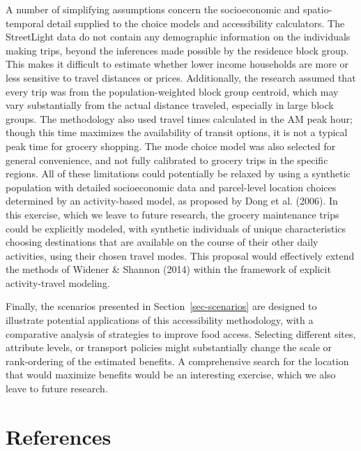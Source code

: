 \documentclass[
  letterpaper,
  number,
  review,
  3p]{elsarticle}
\begin{document}
A number of simplifying assumptions concern the socioeconomic and
spatio-temporal detail supplied to the choice models and accessibility
calculators. The StreetLight data do not contain any demographic
information on the individuals making trips, beyond the inferences made
possible by the residence block group. This makes it difficult to
estimate whether lower income households are more or less sensitive to
travel distances or prices. Additionally, the research assumed that
every trip was from the population-weighted block group centroid, which
may vary substantially from the actual distance traveled, especially in
large block groups. The methodology also used travel times calculated in
the AM peak hour; though this time maximizes the availability of transit
options, it is not a typical peak time for grocery shopping. The mode
choice model was also selected for general convenience, and not fully
calibrated to grocery trips in the specific regions. All of these
limitations could potentially be relaxed by using a synthetic population
with detailed socioeconomic data and parcel-level location choices
determined by an activity-based model, as proposed by Dong et al.
(2006). In this exercise, which we leave to future research, the grocery
maintenance trips could be explicitly modeled, with synthetic
individuals of unique characteristics choosing destinations that are
available on the course of their other daily activities, using their
chosen travel modes. This proposal would effectively extend the methods
of Widener \& Shannon (2014) within the framework of explicit
activity-travel modeling.

Finally, the scenarios presented in Section~\ref{sec-scenarios} are
designed to illustrate potential applications of this accessibility
methodology, with a comparative analysis of strategies to improve food
access. Selecting different sites, attribute levels, or transport
policies might substantially change the scale or rank-ordering of the
estimated benefits. A comprehensive search for the location that would
maximize benefits would be an interesting exercise, which we also leave
to future research.



\section*{References}\label{references}
\end{document}
